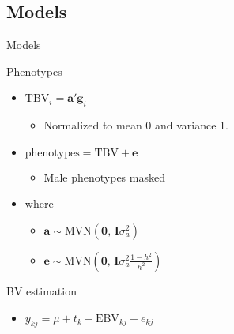 \documentclass{beamer}
\begin{document}
\subsection{Models}
\begin{frame}{Models}
  \begin{block}{Phenotypes}
    \begin{itemize}
    \item $\text{TBV}_i=\mathbf{a'g}_i$
      \begin{itemize}
      \item Normalized to mean 0 and variance 1.
      \end{itemize}
    \item $\text{phenotypes} = \text{TBV} + \mathbf{e}$
      \begin{itemize}
      \item Male phenotypes masked
      \end{itemize}
    \item where
      \begin{itemize}
      \item $\mathbf{a}\sim\text{MVN}(\mathbf{0},\,\mathbf{I}\sigma_a^2)$
      \item $\mathbf{e}\sim\text{MVN}(\mathbf{0},\,\mathbf{I}\sigma_a^2\frac{1-h^2}{h^2})$
      \end{itemize}
    \end{itemize}
  \end{block}
  \begin{block}{BV estimation}
    \begin{itemize}
    \item $y_{kj} = \mu+t_k+\text{EBV}_{kj}+e_{kj}$
    \end{itemize}
  \end{block}
\end{frame}
\end{document}
